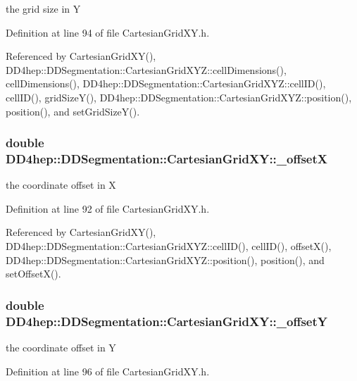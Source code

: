 the grid size in Y 

Definition at line 94 of file CartesianGridXY.h.

Referenced by CartesianGridXY(), DD4hep::DDSegmentation::CartesianGridXYZ::cellDimensions(), cellDimensions(), DD4hep::DDSegmentation::CartesianGridXYZ::cellID(), cellID(), gridSizeY(), DD4hep::DDSegmentation::CartesianGridXYZ::position(), position(), and setGridSizeY().\hypertarget{class_d_d4hep_1_1_d_d_segmentation_1_1_cartesian_grid_x_y_a5ed72cda8a6f4df2c8b4275646ec8d58}{
\subsubsection[{\_\-offsetX}]{\setlength{\rightskip}{0pt plus 5cm}double {\bf DD4hep::DDSegmentation::CartesianGridXY::\_\-offsetX}}}
\label{class_d_d4hep_1_1_d_d_segmentation_1_1_cartesian_grid_x_y_a5ed72cda8a6f4df2c8b4275646ec8d58}


the coordinate offset in X 

Definition at line 92 of file CartesianGridXY.h.

Referenced by CartesianGridXY(), DD4hep::DDSegmentation::CartesianGridXYZ::cellID(), cellID(), offsetX(), DD4hep::DDSegmentation::CartesianGridXYZ::position(), position(), and setOffsetX().\hypertarget{class_d_d4hep_1_1_d_d_segmentation_1_1_cartesian_grid_x_y_ad6ba3d39c309d2a64ce8cd5a784d27c4}{
\subsubsection[{\_\-offsetY}]{\setlength{\rightskip}{0pt plus 5cm}double {\bf DD4hep::DDSegmentation::CartesianGridXY::\_\-offsetY}}}
\label{class_d_d4hep_1_1_d_d_segmentation_1_1_cartesian_grid_x_y_ad6ba3d39c309d2a64ce8cd5a784d27c4}


the coordinate offset in Y 

Definition at line 96 of file CartesianGridXY.h.

